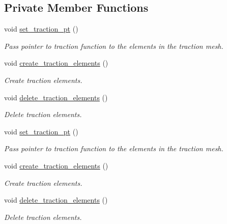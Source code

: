 \subsection*{Private Member Functions}
\begin{DoxyCompactItemize}
\item 
void \hyperlink{classCantileverProblem_a96a9716947a15930f3881fcec6d448e2}{set\+\_\+traction\+\_\+pt} ()
\begin{DoxyCompactList}\small\item\em Pass pointer to traction function to the elements in the traction mesh. \end{DoxyCompactList}\item 
void \hyperlink{classCantileverProblem_abb6f19d964d96a531bf1a60732c72ce9}{create\+\_\+traction\+\_\+elements} ()
\begin{DoxyCompactList}\small\item\em Create traction elements. \end{DoxyCompactList}\item 
void \hyperlink{classCantileverProblem_aeb64122ce3783bf36df3696c41e5d2a5}{delete\+\_\+traction\+\_\+elements} ()
\begin{DoxyCompactList}\small\item\em Delete traction elements. \end{DoxyCompactList}\item 
void \hyperlink{classCantileverProblem_a96a9716947a15930f3881fcec6d448e2}{set\+\_\+traction\+\_\+pt} ()
\begin{DoxyCompactList}\small\item\em Pass pointer to traction function to the elements in the traction mesh. \end{DoxyCompactList}\item 
void \hyperlink{classCantileverProblem_abb6f19d964d96a531bf1a60732c72ce9}{create\+\_\+traction\+\_\+elements} ()
\begin{DoxyCompactList}\small\item\em Create traction elements. \end{DoxyCompactList}\item 
void \hyperlink{classCantileverProblem_aeb64122ce3783bf36df3696c41e5d2a5}{delete\+\_\+traction\+\_\+elements} ()
\begin{DoxyCompactList}\small\item\em Delete traction elements. \end{DoxyCompactList}\end{DoxyCompactItemize}
